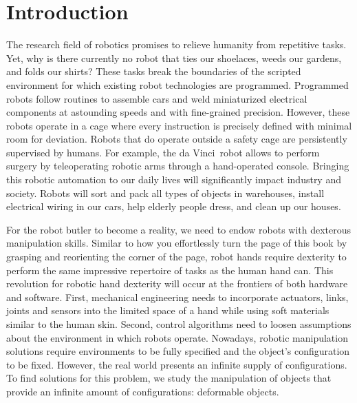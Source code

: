 \documentclass[\home/main.tex]{subfiles}
\begin{document}
    
\chapter{Introduction}\label{ch:introduction}

The research field of robotics promises to relieve humanity from repetitive tasks. Yet, why is there currently no robot that ties our shoelaces, weeds our gardens, and folds our shirts?
These tasks break the boundaries of the scripted environment for which existing robot technologies are programmed. Programmed robots follow routines to assemble cars and weld miniaturized electrical components at astounding speeds and with fine-grained precision. However, these robots operate in a cage where every instruction is precisely defined with minimal room for deviation. Robots that do operate outside a safety cage are persistently supervised by humans. For example, the da Vinci\textregistered\ robot allows to perform surgery by teleoperating robotic arms through a hand-operated console.
Bringing this robotic automation to our daily lives will significantly impact industry and society. Robots will sort and pack all types of objects in warehouses, install electrical wiring in our cars, help elderly people dress, and clean up our houses.

For the robot butler to become a reality, we need to endow robots with dexterous manipulation skills. Similar to how you effortlessly turn the page of this book by grasping and reorienting the corner of the page, robot hands require dexterity to perform the same impressive repertoire of tasks as the human hand can. This revolution for robotic hand dexterity will occur at the frontiers of both hardware and software. First, mechanical engineering needs to incorporate actuators, links, joints and sensors into the limited space of a hand while using soft materials similar to the human skin. Second, control algorithms need to loosen assumptions about the environment in which robots operate. Nowadays, robotic manipulation solutions require environments to be fully specified and the object's configuration to be fixed.
However, the real world presents an infinite supply of configurations.
To find solutions for this problem, we study the manipulation of objects that provide an infinite amount of configurations: deformable objects.
\end{document}
